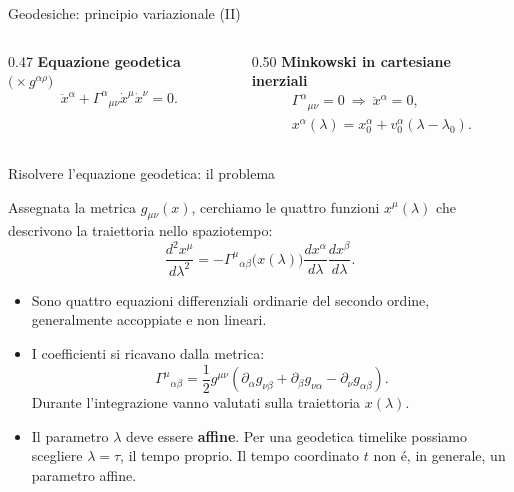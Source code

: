 \begin{frame}[t]{Geodesiche: principio variazionale (II)}
\begin{columns}[T,onlytextwidth]
  \begin{column}{0.47\textwidth}
    \textbf{Equazione geodetica} \(\bigl(\times g^{\alpha\rho}\bigr)\)
    \[
    \ddot x^\alpha+\Gamma^\alpha{}_{\mu\nu}
      \dot x^\mu\dot x^\nu=0.
    \]
  \end{column}
  \begin{column}{0.50\textwidth}
    \textbf{Minkowski in cartesiane inerziali}
    \[
    \begin{gathered}
      \Gamma^\alpha{}_{\mu\nu}=0 \ \Longrightarrow\ \ddot x^\alpha=0,\\
      x^\alpha(\lambda)=x^\alpha_0+v^\alpha_0(\lambda-\lambda_0).
    \end{gathered}
    \]
  \end{column}
\end{columns}
\end{frame}

% 

\begin{frame}[t]{Risolvere l'equazione geodetica: il problema}
\small\raggedright
Assegnata la metrica $g_{\mu\nu}(x)$, cerchiamo le quattro funzioni
$x^\mu(\lambda)$ che descrivono la traiettoria nello spaziotempo:
\[
\boxed{
\frac{d^2x^\mu}{d\lambda^2}
=-\Gamma^\mu{}_{\alpha\beta}\bigl(x(\lambda)\bigr)
\frac{dx^\alpha}{d\lambda}\frac{dx^\beta}{d\lambda}.}
\]
\begin{itemize}
\item Sono quattro equazioni differenziali ordinarie del secondo ordine,
generalmente accoppiate e non lineari.
\item I coefficienti si ricavano dalla metrica:
\[
\Gamma^\mu{}_{\alpha\beta}
=\frac12g^{\mu\nu}
\left(\partial_\alpha g_{\nu\beta}
+\partial_\beta g_{\nu\alpha}
-\partial_\nu g_{\alpha\beta}\right).
\]
Durante l'integrazione vanno valutati sulla traiettoria $x(\lambda)$.
\item Il parametro $\lambda$ deve essere \textbf{affine}.
Per una geodetica timelike possiamo scegliere $\lambda=\tau$, il tempo proprio.
Il tempo coordinato $t$ non \'e, in generale, un parametro affine.
\end{itemize}
\end{frame}

